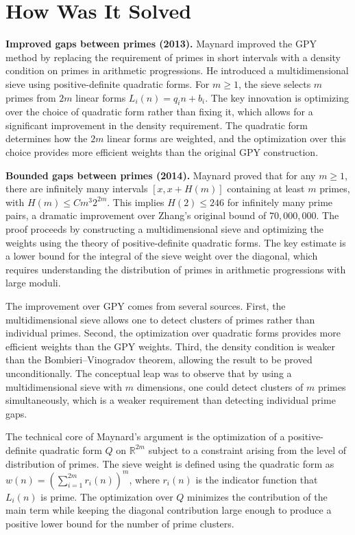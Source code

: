 \section{How Was It Solved}

\textbf{Improved gaps between primes (2013).} Maynard improved the GPY method by replacing the requirement of primes in short intervals with a density condition on primes in arithmetic progressions. He introduced a multidimensional sieve using positive-definite quadratic forms. For $m \ge 1$, the sieve selects $m$ primes from $2m$ linear forms $L_i(n) = q_i n + b_i$. The key innovation is optimizing over the choice of quadratic form rather than fixing it, which allows for a significant improvement in the density requirement. The quadratic form determines how the $2m$ linear forms are weighted, and the optimization over this choice provides more efficient weights than the original GPY construction.

\textbf{Bounded gaps between primes (2014).} Maynard proved that for any $m \ge 1$, there are infinitely many intervals $[x, x + H(m)]$ containing at least $m$ primes, with $H(m) \le C m^3 2^{2m}$. This implies $H(2) \le 246$ for infinitely many prime pairs, a dramatic improvement over Zhang's original bound of $70,000,000$. The proof proceeds by constructing a multidimensional sieve and optimizing the weights using the theory of positive-definite quadratic forms. The key estimate is a lower bound for the integral of the sieve weight over the diagonal, which requires understanding the distribution of primes in arithmetic progressions with large moduli.

The improvement over GPY comes from several sources. First, the multidimensional sieve allows one to detect clusters of primes rather than individual primes. Second, the optimization over quadratic forms provides more efficient weights than the GPY weights. Third, the density condition is weaker than the Bombieri--Vinogradov theorem, allowing the result to be proved unconditionally. The conceptual leap was to observe that by using a multidimensional sieve with $m$ dimensions, one could detect clusters of $m$ primes simultaneously, which is a weaker requirement than detecting individual prime gaps.

The technical core of Maynard's argument is the optimization of a positive-definite quadratic form $Q$ on $\mathbb{R}^{2m}$ subject to a constraint arising from the level of distribution of primes. The sieve weight is defined using the quadratic form as $w(n) = \left( \sum_{i=1}^{2m} r_i(n) \right)^m$, where $r_i(n)$ is the indicator function that $L_i(n)$ is prime. The optimization over $Q$ minimizes the contribution of the main term while keeping the diagonal contribution large enough to produce a positive lower bound for the number of prime clusters.

